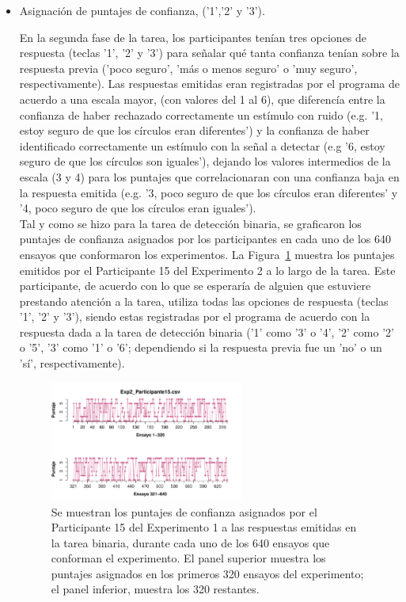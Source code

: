 \begin{itemize}
Las Figuras~\ref{fig:BiasResp_E1} y () muestran las gráficas correspondientes al resto de los participantes en el Experimento 1 y 2, respectivamente.\\

\item Asignación de puntajes de confianza, ('1','2' y '3').

En la segunda fase de la tarea, los participantes tenían tres opciones de respuesta (teclas '1', '2' y '3') para señalar qué tanta confianza tenían sobre la respuesta previa ('poco seguro', 'más o menos seguro' o 'muy seguro', respectivamente). Las respuestas emitidas eran registradas por el programa de acuerdo a una escala mayor, (con valores del 1 al 6), que diferencía entre la confianza de haber rechazado correctamente un estímulo con ruido (e.g. '1, estoy seguro de que los círculos eran diferentes') y la confianza de haber identificado correctamente un estímulo con la señal a detectar (e.g '6, estoy seguro de que los círculos son iguales'), dejando los valores intermedios de la escala (3 y 4) para los puntajes que correlacionaran con una confianza baja en la respuesta emitida (e.g. '3, poco seguro de que los círculos eran diferentes' y '4, poco seguro de que los círculos eran iguales').\\

Tal y como se hizo para la tarea de detección binaria, se graficaron los puntajes de confianza asignados por los participantes en cada uno de los 640 ensayos que conformaron los experimentos. La Figura~\ref{fig:Rating_E2_P4} muestra los puntajes emitidos por el Participante 15 del Experimento 2 a lo largo de la tarea. Este participante, de acuerdo con lo que se esperaría de alguien que estuviere prestando atención a la tarea, utiliza todas las opciones de respuesta (teclas '1', '2' y '3'), siendo estas registradas por el programa de acuerdo con la respuesta dada a la tarea de detección binaria ('1' como '3' o '4', '2' como '2' o '5', '3' como '1' o '6'; dependiendo si la respuesta previa fue un 'no' o un 'sí', respectivamente).\\ 
 
\begin{figure}[th]
\centering
\includegraphics[width=0.60\textwidth]{Figures/Rating_Exp2_P15} 
\caption[Asignacion Puntaje de confianza: Ejemplo]{Se muestran los puntajes de confianza asignados por el Participante 15 del Experimento 1 a las respuestas emitidas en la tarea binaria, durante cada uno de los 640 ensayos que conforman el experimento. El panel superior muestra los puntajes asignados en los primeros 320 ensayos del experimento; el panel inferior, muestra los 320 restantes.}
\label{fig:Rating_E2_P4}
\end{figure}


\end{itemize}

